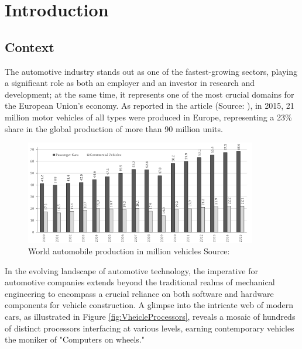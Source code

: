\hypersetup{
    colorlinks=true,
    linkcolor=blue
}

\chapter{Introduction} \label{ch:introduction}

\section{Context}
The automotive industry stands out as one of the fastest-growing sectors, playing a significant role as both an employer and an investor in research and development; at the same time, it represents one of the most crucial domains for the European Union's economy. As reported in the article (Source: \cite{automotiveInCentralEurope}), in 2015, 21 million motor vehicles of all types were produced in Europe, representing a 23\% share in the global production of more than 90 million units.

\begin{figure}[h]  %
  \centering
  \includegraphics[width=0.9\textwidth]{images/automotive_world production.png}  %
  \caption{World automobile production in million vehicles Source: \cite{automotiveInCentralEurope}}
  \label{fig:WorldAutomobileProduction}
\end{figure}

In the evolving landscape of automotive technology, the imperative for automotive companies extends beyond the traditional realms of mechanical engineering to encompass a crucial reliance on both software and hardware components for vehicle construction. A glimpse into the intricate web of modern cars, as illustrated in Figure \ref{fig:VheicleProcessors}, reveals a mosaic of hundreds of distinct processors interfacing at various levels, earning contemporary vehicles the moniker of "Computers on wheels."

